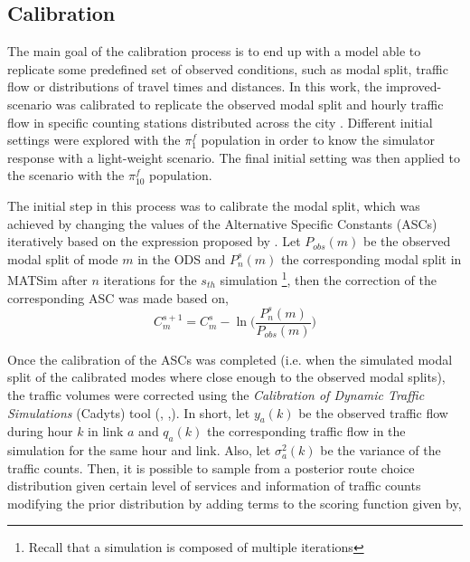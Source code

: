 \documentclass[Journal,letterpaper]{ascelike-new}
\begin{document}
\subsection{Calibration}

The main goal of the calibration process is to end up with a model able to replicate some predefined set of observed conditions, such as modal split, traffic flow or distributions of travel times and distances. In this work, the improved-scenario was calibrated to replicate the observed modal split and hourly traffic flow in specific counting stations distributed across the city \citep{AFOROS2013}. Different initial settings were explored with the $\pi_{1}^{f}$ population in order to know the simulator response with a light-weight scenario. The final initial setting was then applied to the scenario with the $\pi_{10}^{f}$ population.

The initial step in this process was to calibrate the modal split, which was achieved by changing the values of the Alternative Specific Constants (ASCs) iteratively based on the expression proposed by \cite{manski1977estimation}. Let $P_{obs}(m)$ be the observed modal split of mode $m$ in the ODS and $P_{n}^{s}(m)$ the corresponding modal split in MATSim after $n$ iterations for the $s_{th}$ simulation \footnote{Recall that a simulation is composed of multiple iterations}, then the correction of the corresponding ASC was made based on,
\begin{equation}
C_{m}^{s+1}=C_{m}^{s}-\ln\Bigg(\frac{P_{n}^{s}(m)}{P_{obs}(m)}\Bigg)
\end{equation}

Once the calibration of the ASCs was completed (i.e. when the simulated modal split of the calibrated modes where close enough to the observed modal splits), the traffic volumes were corrected using the \emph{Calibration of Dynamic Traffic Simulations} (Cadyts) tool (\cite{cadytsmanual}, \cite{flotterod2011bayesian},\cite{CaDyTS}). In short, let $y_{a}(k)$ be the observed traffic flow during hour $k$ in link $a$ and $q_{a}(k)$ the corresponding traffic flow in the simulation for the same hour and link. Also, let $\sigma_{a}^2(k)$ be the variance of the traffic counts. Then, it is possible to sample from a posterior route choice distribution given certain level of services and information of traffic counts modifying the prior distribution by adding terms to the scoring function given by\citep{flotterod2011bayesian},
\end{document}
